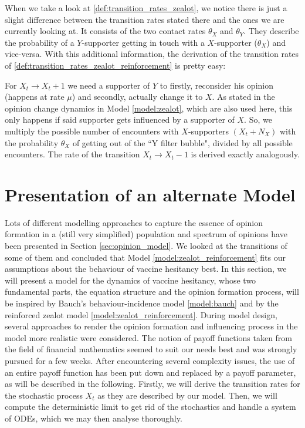 \documentclass[12pt,a4paper,twoside]{article}
\begin{document}
When we take a look at \eqref{def:transition_rates_zealot}, we notice there is just a slight difference between the transition rates stated there and the ones we are currently looking at. It consists of the two contact rates $\theta_X$ and $\theta_Y$. They describe the probability of a $Y$-supporter getting in touch with a $X$-supporter ($\theta_X$) and vice-versa. With this additional information, the derivation of the transition rates of \eqref{def:transition_rates_zealot_reinforcement} is pretty easy:

For $X_t \rightarrow X_t + 1$ we need a supporter of $Y$ to firstly, reconsider his opinion (happens at rate $\mu$) and secondly, actually change it to $X$. As stated in the opinion change dynamics in Model \ref{model:zealot}, which are also used here, this only happens if said supporter gets influenced by a supporter of $X$. So, we multiply the possible number of encounters with $X$-supporters $(X_t + N_X)$ with the probability $\theta_X$ of getting out of the ``Y filter bubble", divided by all possible encounters. The rate of the transition $X_t \rightarrow X_t - 1$ is derived exactly analogously.

\section{Presentation of an alternate Model}\label{sec:my_model}
Lots of different modelling approaches to capture the essence of opinion formation in a (still very simplified) population and spectrum of opinions have been presented in Section \ref{sec:opinion_model}. We looked at the transitions of some of them and concluded that Model \ref{model:zealot_reinforcement} fits our assumptions about the behaviour of vaccine hesitancy best. In this section, we will present a model for the dynamics of vaccine hesitancy, whose two fundamental parts, the equation structure and the opinion formation process, will be inspired by Bauch's behaviour-incidence model \eqref{model:bauch} and by the reinforced zealot model \eqref{model:zealot_reinforcement}. During model design, several approaches to render the opinion formation and influencing process in the model more realistic were considered. The notion of payoff functions taken from the field of financial mathematics seemed to suit our needs best and was strongly pursued for a few weeks. After encountering several complexity issues, the use of an entire payoff function has been put down and replaced by a payoff parameter, as will be described in the following. Firstly, we will derive the transition rates for the stochastic process $X_t$ as they are described by our model. Then, we will compute the deterministic limit to get rid of the stochastics and handle a system of \acp{ODE}, which we may then analyse thoroughly.
\end{document}
